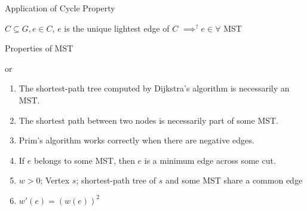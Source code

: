 \begin{frame}{}
  \begin{exampleblock}{Application of Cycle Property }
    \centerline{$C \subseteq G, e \in C$, $e$ is the unique lightest edge of $C$ $\implies^{?} e \in \forall$ MST}
  \end{exampleblock}

  \pause
  \vspace{0.50cm}
\end{frame}

\begin{frame}{Properties of MST}
  \begin{exampleblock}{\cmark or \xmark {}}
    \begin{enumerate}
      \item \xmark The shortest-path tree computed by Dijkstra's algorithm is
      necessarily an MST.
      \item \xmark The shortest path between two nodes is necessarily part of some
      MST.
      \item \cmark Prim's algorithm works correctly when there are negative edges.
      \item \cmark If $e$ belongs to some MST, then $e$ is a minimum edge across some
      cut.
      \item \cmark $w > 0$; Vertex $s$; shortest-path tree of $s$ and some MST share
      a common edge
      \item \cmark $w'(e) = \left(w(e)\right)^2$ 
    \end{enumerate}
  \end{exampleblock}
\end{frame}
